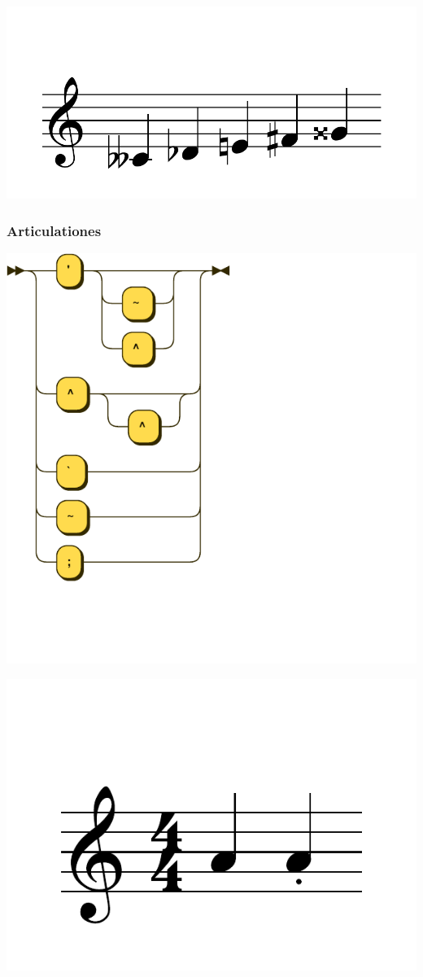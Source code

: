 \documentclass{article}
\begin{document}
\includegraphics[scale=0.5]{figures_tests/pdf/skern/accident2.pdf}

\subsubsection{Articulationes}
\includegraphics[scale=0.5]{figures_railroad/pdf/skern/articulations.pdf}

\includegraphics[scale=0.5]{figures_tests/pdf/skern/articulations0.pdf}
\end{document}
